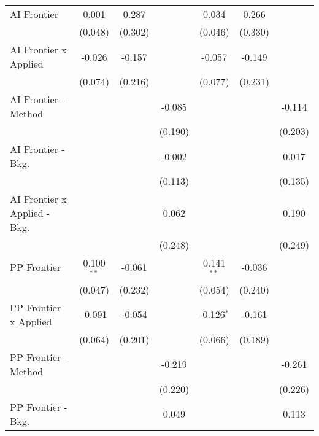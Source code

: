 \begin{tabular}{lcccccc}
   AI Frontier                    & 0.001         & 0.287   &              & 0.034         & 0.266   &   \\   
                                  & (0.048)       & (0.302) &              & (0.046)       & (0.330) &   \\   
   AI Frontier x Applied          & -0.026        & -0.157  &              & -0.057        & -0.149  &   \\   
                                  & (0.074)       & (0.216) &              & (0.077)       & (0.231) &   \\   
   AI Frontier - Method           &               &         & -0.085       &               &         & -0.114\\   
                                  &               &         & (0.190)      &               &         & (0.203)\\   
   AI Frontier - Bkg.             &               &         & -0.002       &               &         & 0.017\\   
                                  &               &         & (0.113)      &               &         & (0.135)\\   
   AI Frontier x Applied - Bkg.   &               &         & 0.062        &               &         & 0.190\\   
                                  &               &         & (0.248)      &               &         & (0.249)\\   
   PP Frontier                    & 0.100$^{**}$  & -0.061  &              & 0.141$^{**}$  & -0.036  &   \\   
                                  & (0.047)       & (0.232) &              & (0.054)       & (0.240) &   \\   
   PP Frontier x Applied          & -0.091        & -0.054  &              & -0.126$^{*}$  & -0.161  &   \\   
                                  & (0.064)       & (0.201) &              & (0.066)       & (0.189) &   \\   
   PP Frontier - Method           &               &         & -0.219       &               &         & -0.261\\   
                                  &               &         & (0.220)      &               &         & (0.226)\\   
   PP Frontier - Bkg.             &               &         & 0.049        &               &         & 0.113\\   

\end{tabular}

